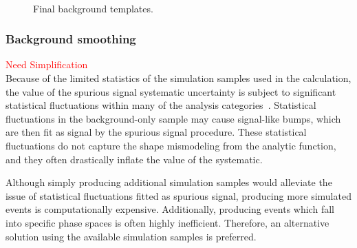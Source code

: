 \begin{figure}[htbp]
   \\
  \caption{Final background templates.}
  \label{fig:BkgData-MC}
\end{figure}
\clearpage


\subsubsection{Background smoothing}
\label{ssec:bkg_smoothing}
\textcolor{red}{Need Simplification} \\

Because of the limited statistics of the simulation samples used in the calculation, the value
of the spurious signal systematic uncertainty is subject to significant statistical fluctuations within
many of the analysis categories~\cite{Hyneman:2712576}. Statistical fluctuations in the background-only sample may cause
signal-like bumps, which are then fit as signal by the spurious signal procedure. These statistical fluctuations do
not capture the shape mismodeling from the analytic function, and they often drastically inflate the
value of the systematic.

Although simply producing additional simulation samples would alleviate the issue of statistical
fluctuations fitted as spurious signal, producing more simulated events is computationally
expensive. Additionally, producing events which fall into specific phase spaces is often highly inefficient. 
Therefore, an alternative solution using the available simulation samples is preferred. 

